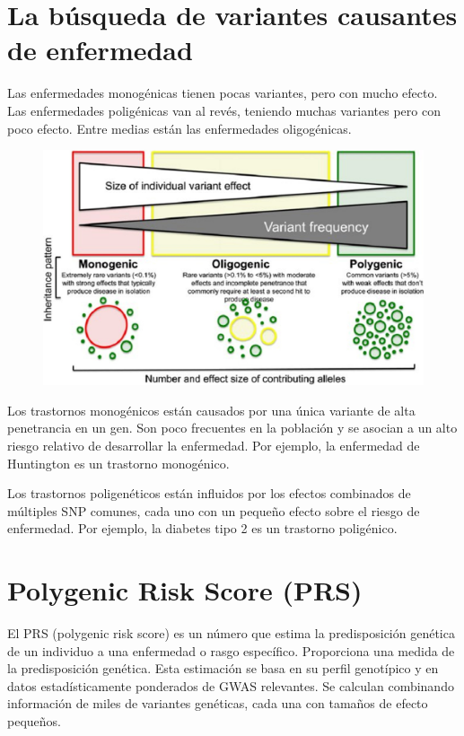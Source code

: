 \section{La búsqueda de variantes causantes de enfermedad}
Las enfermedades monogénicas tienen pocas variantes, pero con mucho efecto. Las enfermedades poligénicas van al revés, teniendo muchas variantes pero con poco efecto. Entre medias están las enfermedades oligogénicas. 

\begin{figure}[htbp]
\centering
\includegraphics[width = 0.8 \textwidth]{figs/Imagen1.jpg}
\end{figure}

Los trastornos monogénicos están causados por una única variante de alta penetrancia en un gen. 
Son poco frecuentes en la población y se asocian a un alto riesgo relativo de desarrollar la enfermedad. 
Por ejemplo, la enfermedad de Huntington es un trastorno monogénico.

Los trastornos poligenéticos están influidos por los efectos combinados de múltiples SNP comunes, cada uno con un pequeño efecto sobre el riesgo de enfermedad. 
Por ejemplo, la diabetes tipo 2 es un trastorno poligénico.

\section{Polygenic Risk Score (PRS)}
El PRS (polygenic risk score) es un número que estima la predisposición genética de un individuo a una enfermedad o rasgo específico. Proporciona una medida de la predisposición genética. Esta estimación se basa en su perfil genotípico y en datos estadísticamente ponderados de GWAS relevantes. Se calculan combinando información de miles de variantes genéticas, cada una con tamaños de efecto pequeños.

